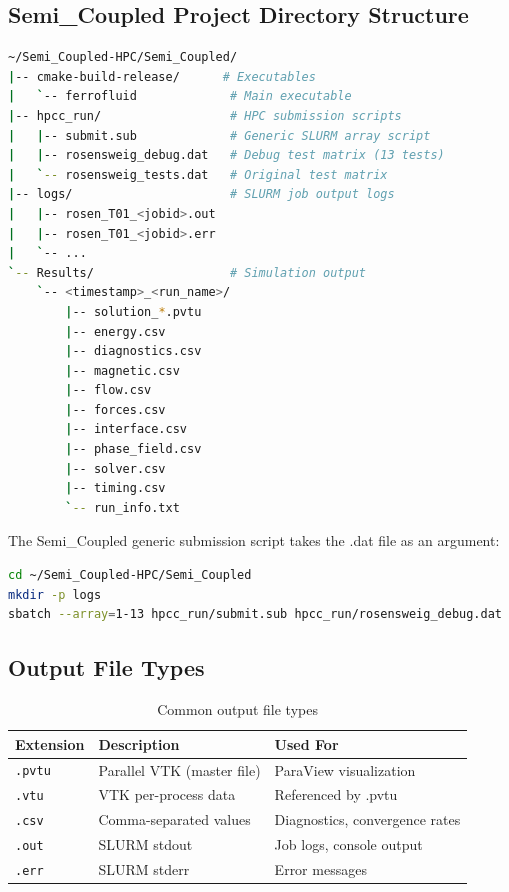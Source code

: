\documentclass[11pt,a4paper]{article}
\begin{document}
\subsection{Semi\_Coupled Project Directory Structure}
\begin{lstlisting}[language=bash]
~/Semi_Coupled-HPC/Semi_Coupled/
|-- cmake-build-release/      # Executables
|   `-- ferrofluid             # Main executable
|-- hpcc_run/                  # HPC submission scripts
|   |-- submit.sub             # Generic SLURM array script
|   |-- rosensweig_debug.dat   # Debug test matrix (13 tests)
|   `-- rosensweig_tests.dat   # Original test matrix
|-- logs/                      # SLURM job output logs
|   |-- rosen_T01_<jobid>.out
|   |-- rosen_T01_<jobid>.err
|   `-- ...
`-- Results/                   # Simulation output
    `-- <timestamp>_<run_name>/
        |-- solution_*.pvtu
        |-- energy.csv
        |-- diagnostics.csv
        |-- magnetic.csv
        |-- flow.csv
        |-- forces.csv
        |-- interface.csv
        |-- phase_field.csv
        |-- solver.csv
        |-- timing.csv
        `-- run_info.txt
\end{lstlisting}

\begin{notebox}
The Semi\_Coupled generic submission script takes the .dat file as an argument:
\begin{lstlisting}[language=bash]
cd ~/Semi_Coupled-HPC/Semi_Coupled
mkdir -p logs
sbatch --array=1-13 hpcc_run/submit.sub hpcc_run/rosensweig_debug.dat
\end{lstlisting}
\end{notebox}

\subsection{Output File Types}
\begin{table}[h]
\centering
\begin{tabular}{@{}lll@{}}
\toprule
\textbf{Extension} & \textbf{Description} & \textbf{Used For} \\
\midrule
\texttt{.pvtu} & Parallel VTK (master file) & ParaView visualization \\
\texttt{.vtu} & VTK per-process data & Referenced by .pvtu \\
\texttt{.csv} & Comma-separated values & Diagnostics, convergence rates \\
\texttt{.out} & SLURM stdout & Job logs, console output \\
\texttt{.err} & SLURM stderr & Error messages \\
\bottomrule
\end{tabular}
\caption{Common output file types}
\end{table}
\end{document}
